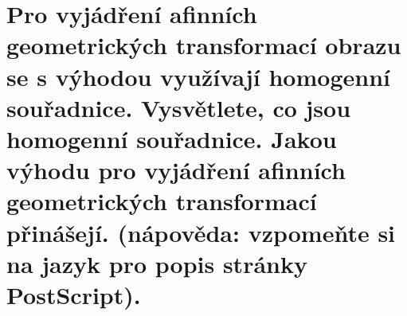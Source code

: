\section{Pro vyjádření afinních geometrických transformací obrazu se s výhodou využívají homogenní souřadnice. 
Vysvětlete, co jsou homogenní souřadnice. Jakou výhodu pro vyjádření afinních geometrických transformací přinášejí. 
(nápověda: vzpomeňte si na jazyk pro popis stránky PostScript).}